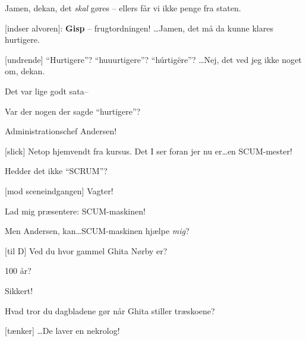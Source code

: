 \documentclass[a4paper,11pt]{article}
\begin{document}
\begin{sketch}
 Jamen, dekan, det \emph{skal} gøres -- ellers får vi ikke penge fra
staten.

[indser alvoren]: \textbf{Gisp} -- frugtordningen!  \ldots Jamen, det må
da kunne klares hurtigere.

[undrende] ``Hurtigere''?   ``huuurtigere''?  ``húrtigëre''? \ldots Nej, det ved
jeg ikke noget om, dekan.

 Det var lige godt sata--


 Var der nogen der sagde ``hurtigere''?

 Administrationschef Andersen!

[slick] Netop hjemvendt fra kursus.  Det I ser foran jer nu er\ldots en
SCUM-mester!


 Hedder det ikke ``SCRUM''?


[mod sceneindgangen] Vagter!


 Lad mig præsentere:  SCUM-maskinen!


 Men Andersen, kan\ldots SCUM-maskinen hjælpe \emph{mig}?



[til D] Ved du hvor gammel Ghita Nørby er?

 100 år?

 Sikkert! 


 Hvad tror du dagbladene gør når Ghita stiller træskoene?

[tænker] \ldots De laver en nekrolog!




\end{sketch}
\end{document}
